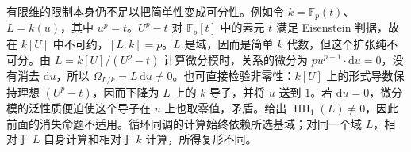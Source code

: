 \ProseParagraphBreak
有限维的限制本身仍不足以把简单性变成可分性。例如令 \(k=\mathbb F_p(t)\)、\(L=k(u)\)，其中 \(u^p=t\)。\(U^p-t\) 对 \(\mathbb F_p[t]\) 中的素元 \(t\) 满足 Eisenstein 判据，故在 \(k[U]\) 中不可约，\([L:k]=p\)。\(L\) 是域，因而是简单 \(k\) 代数，但这个扩张纯不可分。由 \(L=k[U]/(U^p-t)\) 计算微分模时，关系的微分为 \(p u^{p-1}\cdot\mathrm d u=0\)，没有消去 \(\mathrm d u\)，所以 \(\Omega_{L/k}=L\,\mathrm d u\ne0\)。也可直接检验非零性：\(k[U]\) 上的形式导数保持理想 \((U^p-t)\)，因而下降为 \(L\) 上的 \(k\) 导子，并将 \(u\) 送到 \(1\)。若 \(\mathrm d u=0\)，微分模的泛性质便迫使这个导子在 \(u\) 上也取零值，矛盾。给出 \(\operatorname{HH}_1(L)\ne0\)，因此前面的消失命题不适用。循环同调的计算始终依赖所选基域；对同一个域 \(L\)，相对于 \(L\) 自身计算和相对于 \(k\) 计算，所得复形不同。
